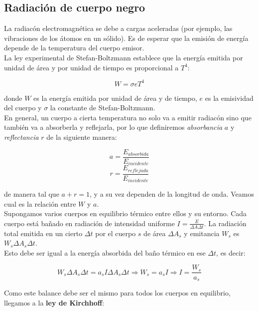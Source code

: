 \documentclass[a4paper]{article}
\begin{document}
\subsection{Radiaci\'on de cuerpo negro}

La radiac\'on electromagn\'etica se debe a cargas aceleradas (por ejemplo, las vibraciones de los \'atomos en un s\'olido). Es de esperar que la emisi\'on de energ\'ia depende de la temperatura del cuerpo emisor.\\

La ley experimental de Stefan-Boltzmann establece que la energ\'ia emitida por unidad de \'area y por unidad de tiempo es proporcional a $T^{4}$:

\begin{equation}
\label{eq:sb}
W = \sigma e T^{4}
\end{equation}

donde $W$ es la energ\'ia emitida por unidad de \'area y de tiempo, $e$ es la emisividad del cuerpo y $\sigma$ la constante de Stefan-Boltzmann.\\

En general, un cuerpo a cierta temperatura no solo va a emitir radiac\'on sino que tambi\'en va a absorberla y reflejarla, por lo que definiremos \textit{absorbancia} $a$ y \textit{reflectancia} $r$ de la siguiente manera:

$$ a = \frac{E_{absorbida}}{E_{incidente}}$$
$$ r = \frac{E_{reflejada}}{E_{incidente}}$$

de manera tal que $a + r = 1$, y a su vez dependen de la longitud de onda. Veamos cual es la relaci\'on entre $W$ y $a$.\\

Supongamos varios cuerpos en equilibrio t\'ermico entre ellos y su entorno. Cada cuerpo est\'a ba\~nado en radiaci\'on de intensidad uniforme $I = \frac{E}{\Delta A \Delta t}$. La radiaci\'on total emitida en un cierto $\Delta t$ por el cuerpo $s$ de \'area $\Delta A_{s}$ y emitancia $W_{s}$ es $W_{s}\Delta A_{s} \Delta t$.\\

Esto debe ser igual a la energ\'ia absorbida del ba\~no t\'ermico en ese $\Delta t$, es decir:

$$W_{s}\Delta A_{s} \Delta t = a_{s}I\Delta A_{s}\Delta t \Rightarrow W_{s} = a_{s}I \Rightarrow I = \frac{W_{s}}{a_{s}}$$

Como este balance debe ser el mismo para todos los cuerpos en equilibrio, llegamos a la \textbf{ley de Kirchhoff}:
\end{document}
